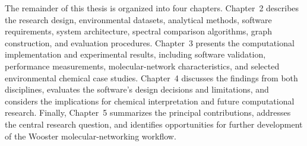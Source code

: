        The remainder of this thesis is organized into four chapters. Chapter~2 describes the research design, environmental datasets, analytical methods, software requirements, system architecture, spectral comparison algorithms, graph construction, and evaluation procedures. Chapter~3 presents the computational implementation and experimental results, including software validation, performance measurements, molecular-network characteristics, and selected environmental chemical case studies. Chapter~4 discusses the findings from both disciplines, evaluates the software's design decisions and limitations, and considers the implications for chemical interpretation and future computational research. Finally, Chapter~5 summarizes the principal contributions, addresses the central research question, and identifies opportunities for further development of the Wooster molecular-networking workflow.
